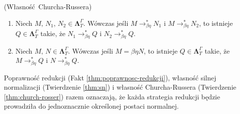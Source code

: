 

\begin{twierdzenie}\label{thm:church-rosser}(Własność Churcha-Russera)
  \begin{enumerate}[label=CR\arabic*.]
  \item Niech \(M,\,N_1,\,N_2\in\mathbf{\Lambda}^{\Gamma}_{T}\). Wówczas jeśli 
        \(M \longrightarrow^*_{\beta\eta} N_1\) i \(M \longrightarrow^{*}_{\beta\eta} N_2\),
        to istnieje \(Q\in\mathbf{\Lambda}^{\Gamma}_{T}\) takie, że
        \(N_1 \longrightarrow^*_{\beta\eta} Q\) i \(N_2 \longrightarrow^*_{\beta\eta} Q\).
  \item Niech \(M,\,N\in\mathbf{\Lambda}^{\Gamma}_{T}\). Wówczas jeśli 
        \(M ={\beta\eta} N\), to  istnieje \(Q\in\mathbf{\Lambda}^{\Gamma}_{T}\) takie, że
        \(M \longrightarrow^*_{\beta\eta} Q\) i \(N \longrightarrow^*_{\beta\eta} Q\).
  \end{enumerate}
  \begin{dowod}
  \cite[3.6.3]{Urzyczyn2006}
  \end{dowod}
\end{twierdzenie}

Poprawność redukcji (Fakt \ref{thm:poprawnosc-redukcji}), własność silnej normalizacji (Twierdzenie \ref{thm:sn}) i własność Churcha-Russera (Twierdzenie \ref{thm:church-rosser}) razem oznaczają, że każda strategia redukcji będzie prowadziła do jednoznacznie określonej postaci normalnej.
